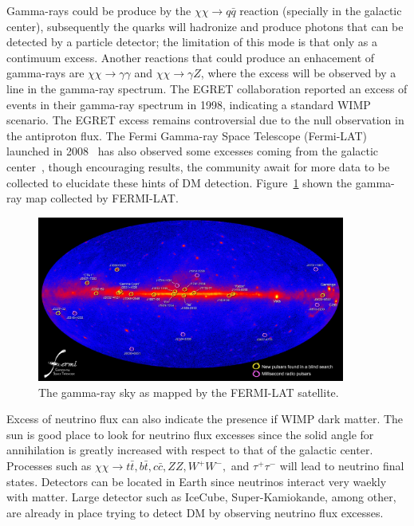 Gamma-rays could be produce by the $\chi\chi\rightarrow q\bar{q}$
reaction (specially in the galactic center), subsequently the quarks will hadronize and produce photons
that can be detected by a particle detector; the limitation of this
mode is that only as a contimuum excess. Another reactions that could
produce an enhacement of gamma-rays are $\chi\chi\rightarrow
\gamma\gamma$ and $\chi\chi\rightarrow
\gamma Z$, where the excess will be observed by a line in the
gamma-ray spectrum. The EGRET collaboration reported an excess of
events in their gamma-ray spectrum in 1998\cite{EGRETT}, indicating a
standard WIMP scenario. The EGRET excess remains controversial due to
the null observation in the antiproton flux. The Fermi Gamma-ray Space
Telescope (Fermi-LAT) launched in 2008~\cite{FERMILAT} has also observed some
excesses coming from the galactic center~\cite{FermiExcess}, though encouraging results,
the community await for more data to be collected to elucidate these
hints of DM detection. Figure~\ref{fig:FERMI} shown the gamma-ray map
collected by FERMI-LAT.

\begin{figure}
 \centering
\includegraphics[width=0.9\textwidth]{IntroFigures/Fermi_Map.jpg}
\caption{The gamma-ray sky as mapped by the FERMI-LAT satellite.\label{fig:FERMI}}
\end{figure}

Excess of neutrino flux can also indicate the presence if WIMP dark
matter. The sun is  good place to look for neutrino flux excesses
since the solid angle for annihilation is greatly increased with
respect to that of the galactic center. Processes such as
$\chi\chi\rightarrow t\bar{t}, b\bar{t}, c\bar{c}, ZZ, W^{+}W^{-},$ and
$\tau^{+}\tau^{-}$ will lead to neutrino final states. Detectors can
be located in Earth since  neutrinos interact very waekly with
matter. Large detector such as IceCube, Super-Kamiokande, among other, are already in place trying to detect DM by
observing neutrino flux excesses.


